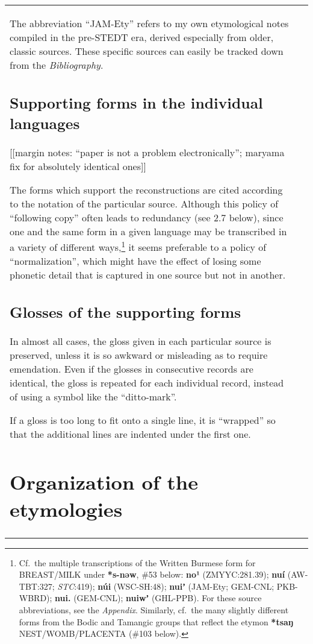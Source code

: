 \begin{itemize}
\begin{tabular}{l l}
The abbreviation “JAM-Ety” refers to my own etymological notes compiled in the
pre-STEDT era, derived especially from older, classic sources.  These specific
sources can easily be tracked down from the \textit{Bibliography}.

\subsection{Supporting forms in the individual languages}

[[margin notes: ``paper is not a problem electronically''; maryama fix for absolutely identical ones]]

The forms which support the reconstructions are cited according to the
notation of the particular source.  Although this policy of “following copy”
often leads to redundancy (see 2.7 below), since one and the same form in a
given language may be transcribed in a variety of different ways,\footnote{Cf.\ the
multiple transcriptions of the Written Burmese form for BREAST/MILK under
\textbf{*s-nəw}, \#53 below:  \textbf{no¹}
(ZMYYC:281.39); \textbf{nuí} (AW-TBT:327; \textit{STC}:419); \textbf{núi}
(WSC-SH:48); \textbf{nuiʼ} (JAM-Ety; GEM-CNL; PKB-WBRD);
\textbf{nui.} (GEM-CNL); \textbf{nuiwʼ} (GHL-PPB).
 For these source abbreviations, see the \textit{Appendix}. Similarly, cf.\ the many slightly different forms from the Bodic and Tamangic groups that reflect the etymon \textbf{*tsaŋ} NEST/WOMB/PLACENTA (\#103 below).} it seems preferable to a
policy of “normalization”, which might have the effect of losing some phonetic
detail that is captured in one source but not in another.

\subsection{Glosses of the supporting forms}


In almost all cases, the gloss given in each particular source is preserved,
unless it is so awkward or misleading as to require emendation.  Even if the
glosses in consecutive records are identical, the gloss is repeated for each
individual record, instead of using a symbol like the “ditto-mark”.  


If a gloss is too long to fit onto a single line, it is “wrapped” so that
the additional lines are indented under the first one.


\section{Organization of the etymologies}


\end{tabular}
\end{itemize}

